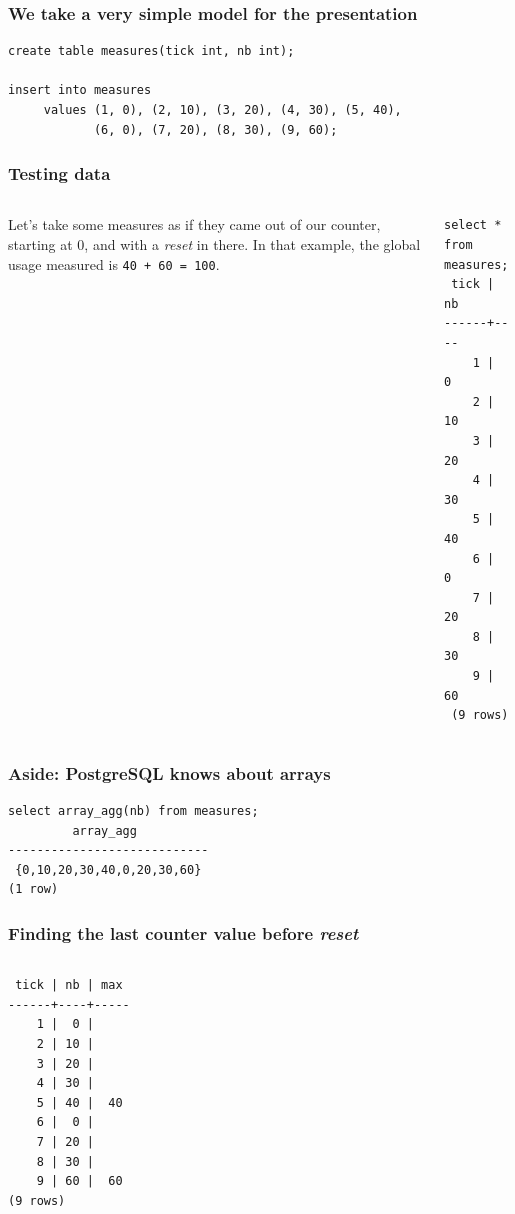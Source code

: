 \documentclass{beamer}
\begin{document}
\begin{frame}[fragile]
  \frametitle{We take a very simple model for the presentation}

\begin{verbatim}
create table measures(tick int, nb int);

insert into measures
     values (1, 0), (2, 10), (3, 20), (4, 30), (5, 40),
            (6, 0), (7, 20), (8, 30), (9, 60);
\end{verbatim}
\end{frame}

\begin{frame}[fragile]
  \frametitle{Testing data}

  \begin{columns}
    
    Let's take some measures as if they came out of our counter, starting at
    0, and with a \textit{reset} in there. In that example, the global usage
    measured is {\Large \texttt{40 + 60 = 100}}.


    \begin{verbatim}
select * from measures;
 tick | nb 
------+----
    1 |  0
    2 | 10
    3 | 20
    4 | 30
    5 | 40
    6 |  0
    7 | 20
    8 | 30
    9 | 60
 (9 rows)
    \end{verbatim}
  \end{columns}
\end{frame}

\begin{frame}[fragile]
  \frametitle{Aside: PostgreSQL knows about arrays}

\begin{verbatim}
select array_agg(nb) from measures;
         array_agg          
----------------------------
 {0,10,20,30,40,0,20,30,60}
(1 row)
\end{verbatim}
\end{frame}

\begin{frame}[fragile]
  \frametitle{Finding the last counter value before \textit{reset}}

\begin{columns}
\begin{verbatim}
 tick | nb | max 
------+----+-----
    1 |  0 |    
    2 | 10 |    
    3 | 20 |    
    4 | 30 |    
    5 | 40 |  40
    6 |  0 |    
    7 | 20 |    
    8 | 30 |    
    9 | 60 |  60
(9 rows)
\end{verbatim}
\end{columns}
\end{frame}
\end{document}
